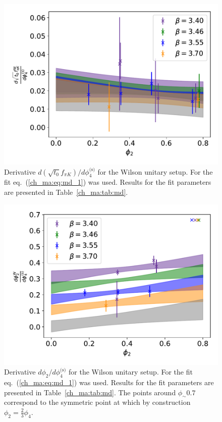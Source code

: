 \begin{figure}
    \centering
    \includegraphics[width=1.\textwidth]{./cap4/figs/dt0fpik_w.pdf}
    \caption{Derivative $d\left(\sqrt{t_0}f_{\pi K}\right)/d\phi_4^{\textrm{(s)}}$ for the Wilson unitary setup. For the fit eq.~(\ref{ch_ma:eq:md_1}) was used. Results for the fit parameters are presented in Table~\ref{ch_ma:tab:md}.}
    \label{ch_ma:fig:dfpik_w}
\end{figure}

\begin{figure}
    \centering
    \includegraphics[width=1.\textwidth]{./cap4/figs/dphi2_w.pdf}
    \caption{Derivative $d\phi_2/d\phi_4^{\textrm{(s)}}$ for the Wilson unitary setup. For the fit eq.~(\ref{ch_ma:eq:md_1}) was used. Results for the fit parameters are presented in Table~\ref{ch_ma:tab:md}. The points around $\phi_\sim0.7$ correspond to the symmetric point at which by construction $\phi_2=\frac{2}{3}\phi_4$.}
    \label{ch_ma:fig:dphi2_w}
\end{figure}

